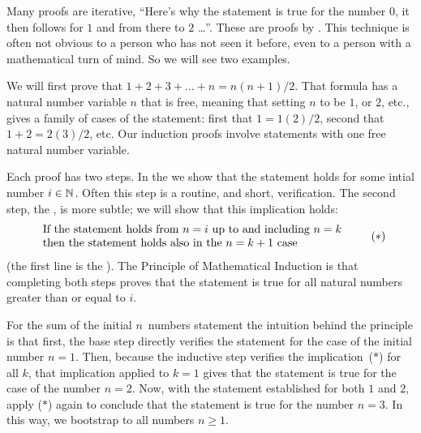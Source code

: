 
Many proofs are iterative,
``Here's why the statement is true for the number \( 0 \), 
it then follows for \( 1 \) and from there to \( 2 \) \ldots''.
These are proofs by 
.
This technique is often not obvious to a person who has not seen it before, 
even to a person with a mathematical turn of mind.
So we will see two examples.

We will first prove that \( 1+2+3+\dots+n=n(n+1)/2 \). 
That formula has a natural number variable $n$
that is free, meaning that setting $n$ to be $1$,
or $2$, etc., gives a family of cases of the statement:
first that $1=1(2)/2$, second that $1+2=2(3)/2$, etc.
Our induction proofs involve statements with one free natural number 
variable.

Each proof has two steps. 
In the 
we show that the statement holds for
some intial number $i\in \mathbb{N}$. 
Often this step is a routine, and short, verification.
The second step, 
the ,
is more subtle; we will show that this implication holds:
\begin{equation*}
  \begin{tabular}{l}
    \text{If the statement holds from $n=i$ up to and including~$n=k$} 
     \\
    \text{then the statement holds also in the $n=k+1$ case}
  \end{tabular}
  \tag{$*$}
\end{equation*}
(the first line is the 
).
The Principle of Mathematical Induction
is that completing both steps proves that the statement is
true for all natural numbers greater than or equal to $i$.

For the sum of the initial $n$~numbers statement  
the intuition behind the principle is that first, the base step directly 
verifies the statement for the case of the initial number $n=1$. 
Then, because the inductive step verifies the implication~($*$)
for all $k$, that implication applied to $k=1$
gives that the statement is true for the case of the number
$n=2$. 
Now, with the statement established for both $1$ and $2$, 
apply ($*$) again to conclude that the statement is true for the number
$n=3$.
In this way, we bootstrap to all numbers $n\geq 1$. 

